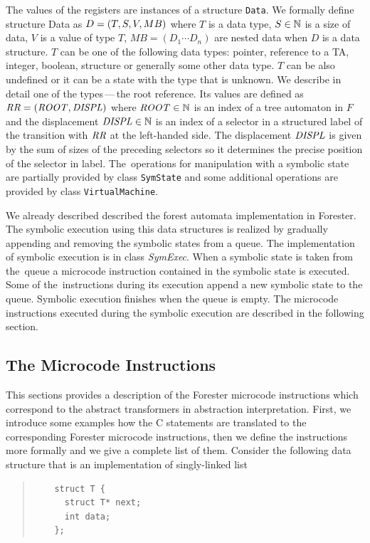 The values of the registers are instances of a structure {\tt Data}.
We formally define structure Data as $D = (T,S,V,MB)$ where
$T$ is a data type,
$S \in \mathbb{N}$ is a size of data,
$V$ is a value of type $T$,
$\mathit{MB}=(D_1 \cdots D_n)$ are nested data when $D$ is a data structure.
$T$ can be one of the following data types: pointer, reference to a TA, integer, boolean,
structure or generally some other data type.
$T$ can be also undefined or it can be a state with the type that is unknown.
We describe in detail one of the types\,---\,the root reference.
Its values are defined as $\mathit{RR}=(\mathit{ROOT}, \mathit{DISPL})$
where $\mathit{ROOT} \in \mathbb{N}$ is an index of a tree automaton in $F$
and the displacement $\mathit{DISPL} \in \mathbb{N}$ is an index of a selector in a structured label of
the transition with $\mathit{RR}$ at the left-handed side.
The displacement $\mathit{DISPL}$ is given by the sum of sizes of the preceding selectors
so it determines the precise position of the selector in label.
The~operations for manipulation with a symbolic state are partially provided by class {\tt SymState}
and some additional operations are provided by class {\tt VirtualMachine}.

We already described described the forest automata implementation in Forester.
The symbolic execution using this data structures is realized by gradually appending
and removing the symbolic states from a queue.
The implementation of symbolic execution is in class \emph{SymExec}.
When a symbolic state is taken from the~queue a microcode instruction contained in
the symbolic state is executed.
Some of the~instructions during its execution append a new symbolic state to the queue.
Symbolic execution finishes when the queue is empty.
The microcode instructions executed during the symbolic execution are described in the following section.

\subsection{The Microcode Instructions}
\label{subsec:microinstr}

This sections provides a description of the Forester microcode instructions
which correspond to the abstract transformers in abstraction interpretation.
First, we introduce some examples how the C statements are translated
to the corresponding Forester microcode instructions, then we define the instructions
more formally and we give a complete list of them.
Consider the following data structure that is an implementation of singly-linked list
\newpage
	\begin{quote}
	\begin{verbatim}
	struct T {
      struct T* next;
      int data;
	};

	\end{verbatim}
	\end{quote}
	
